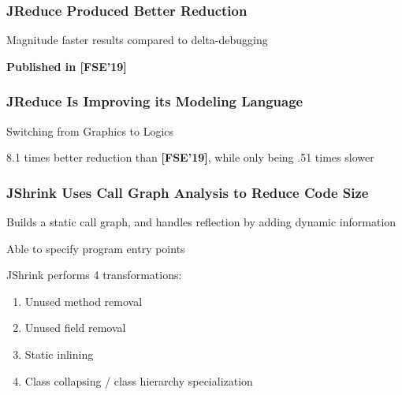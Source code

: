\documentclass[aspectratio=169]{beamer}
\begin{document}
  \begin{frame}
    \frametitle{JReduce Produced Better Reduction}


    \vspace{-2em}

    Magnitude faster results compared to delta-debugging

    \vspace{2em}

    \textbf{Published in [FSE'19]}
  \end{frame}

  \begin{frame}
    \frametitle{JReduce Is Improving its Modeling Language}


    Switching from Graphics to Logics

    \vspace{2em}

    8.1 times better reduction than \textbf{[FSE'19]}, while only being .51
    times slower
  \end{frame}

  \begin{frame}
    \frametitle{JShrink Uses Call Graph Analysis to Reduce Code Size}

    Builds a static call graph, and handles reflection by adding dynamic
    information

    \vspace{2em}

    Able to specify program entry points

    \vspace{2em}

    JShrink performs 4 transformations:
    \begin{enumerate}
      \item Unused method removal
      \item Unused field removal
      \item Static inlining
      \item Class collapsing / class hierarchy specialization
    \end{enumerate}
  \end{frame}
\end{document}
